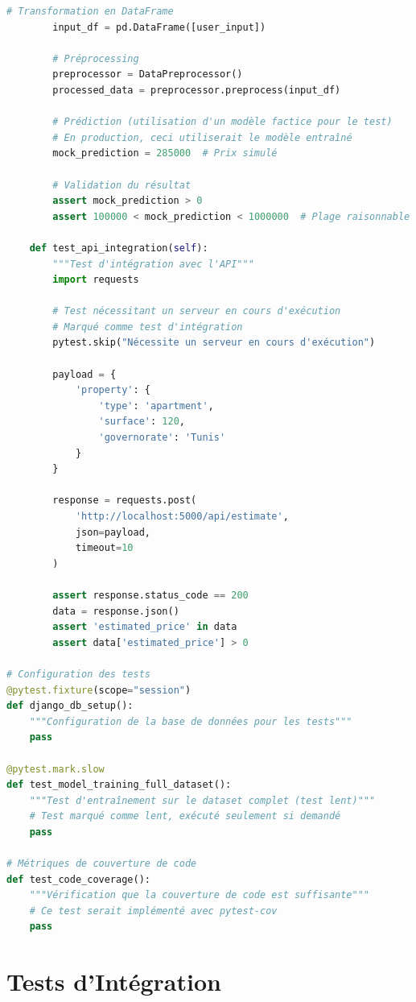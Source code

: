 \begin{lstlisting}[language=Python, caption=Tests unitaires PyTest - Modèles ML]
        # Transformation en DataFrame
        input_df = pd.DataFrame([user_input])
        
        # Préprocessing
        preprocessor = DataPreprocessor()
        processed_data = preprocessor.preprocess(input_df)
        
        # Prédiction (utilisation d'un modèle factice pour le test)
        # En production, ceci utiliserait le modèle entraîné
        mock_prediction = 285000  # Prix simulé
        
        # Validation du résultat
        assert mock_prediction > 0
        assert 100000 < mock_prediction < 1000000  # Plage raisonnable
    
    def test_api_integration(self):
        """Test d'intégration avec l'API"""
        import requests
        
        # Test nécessitant un serveur en cours d'exécution
        # Marqué comme test d'intégration
        pytest.skip("Nécessite un serveur en cours d'exécution")
        
        payload = {
            'property': {
                'type': 'apartment',
                'surface': 120,
                'governorate': 'Tunis'
            }
        }
        
        response = requests.post(
            'http://localhost:5000/api/estimate',
            json=payload,
            timeout=10
        )
        
        assert response.status_code == 200
        data = response.json()
        assert 'estimated_price' in data
        assert data['estimated_price'] > 0

# Configuration des tests
@pytest.fixture(scope="session")
def django_db_setup():
    """Configuration de la base de données pour les tests"""
    pass

@pytest.mark.slow
def test_model_training_full_dataset():
    """Test d'entraînement sur le dataset complet (test lent)"""
    # Test marqué comme lent, exécuté seulement si demandé
    pass

# Métriques de couverture de code
def test_code_coverage():
    """Vérification que la couverture de code est suffisante"""
    # Ce test serait implémenté avec pytest-cov
    pass
\end{lstlisting}

\section{Tests d'Intégration}

